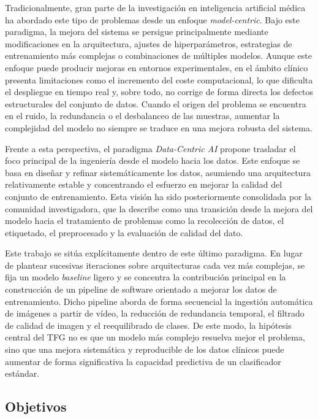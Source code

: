 ﻿\documentclass[10pt,a4paper,twocolumn,twoside]{article}
\begin{document}
Tradicionalmente, gran parte de la investigación en inteligencia artificial médica ha abordado este tipo de problemas desde un enfoque \textit{model-centric}. Bajo este paradigma, la mejora del sistema se persigue principalmente mediante modificaciones en la arquitectura, ajustes de hiperparámetros, estrategias de entrenamiento más complejas o combinaciones de múltiples modelos. Aunque este enfoque puede producir mejoras en entornos experimentales, en el ámbito clínico presenta limitaciones como el incremento del coste computacional, lo que dificulta el despliegue en tiempo real y, sobre todo, no corrige de forma directa los defectos estructurales del conjunto de datos. Cuando el origen del problema se encuentra en el ruido, la redundancia o el desbalanceo de las muestras, aumentar la complejidad del modelo no siempre se traduce en una mejora robusta del sistema.\cite{zha2025datacentric}

Frente a esta perspectiva, el paradigma \textit{Data-Centric AI} propone trasladar el foco principal de la ingeniería desde el modelo hacia los datos. Este enfoque se basa en diseñar y refinar sistemáticamente los datos, asumiendo una arquitectura relativamente estable y concentrando el esfuerzo en mejorar la calidad del conjunto de entrenamiento.\cite{ng_datacentric} Esta visión ha sido posteriormente consolidada por la comunidad investigadora, que la describe como una transición desde la mejora del modelo hacia el tratamiento de problemas como la recolección de datos, el etiquetado, el preprocesado y la evaluación de calidad del dato.\cite{zha2025datacentric}

Este trabajo se sitúa explícitamente dentro de este último paradigma. En lugar de plantear sucesivas iteraciones sobre arquitecturas cada vez más complejas, se fija un modelo \textit{baseline} ligero y se concentra la contribución principal en la construcción de un pipeline de software orientado a mejorar los datos de entrenamiento. Dicho pipeline aborda de forma secuencial la ingestión automática de imágenes a partir de vídeo, la reducción de redundancia temporal, el filtrado de calidad de imagen y el reequilibrado de clases. De este modo, la hipótesis central del TFG no es que un modelo más complejo resuelva mejor el problema, sino que una mejora sistemática y reproducible de los datos clínicos puede aumentar de forma significativa la capacidad predictiva de un clasificador estándar.\cite{zha2025datacentric, ng_datacentric}

\subsection{Objetivos}
\end{document}
